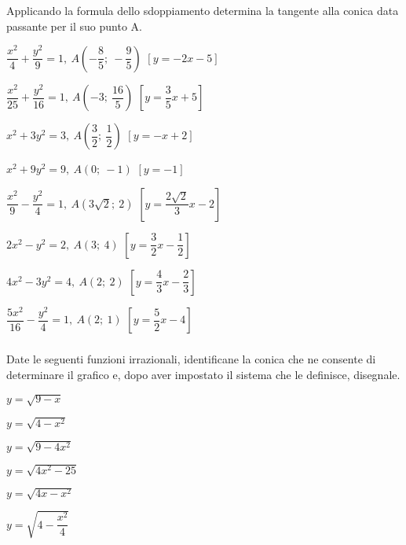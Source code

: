 \begin{esercizio}
  \label{ese:div.003}
  Applicando la formula dello sdoppiamento determina la tangente alla 
conica data passante per il suo punto A.
  \begin{enumeratea}
\item \(\dfrac{x^{2}}{4}+\dfrac{y^{2}}{9}=1,~A\left(-\dfrac{8}{5};~- 
\dfrac{9}{5}\right)\)  
\hfill \(\left[y=-2x-5\right]\)
\item \(\dfrac{x^{2}}{25}+\dfrac{y^{2}}{16}=1,~A\left(-3;~\dfrac{16}{5} 
\right)\)
\hfill \(\left[y=\dfrac{3}{5}x+5\right]\)
\item \(x^{2}+3y^{2}=3,~A\left(\dfrac{3}{2};~\dfrac{1}{2} \right)\)
\hfill \(\left[y=-x+2\right]\)
\item \(x^{2}+9y^{2}=9,~A(0;~-1)\)
\hfill \(\left[y=-1\right]\)
\item \(\dfrac{x^{2}}{9}-\dfrac{y^{2}}{4}=1,~A\left(3\sqrt{2};~2\right)\)
\hfill \(\left[y=\dfrac{2\sqrt{2}}{3}x-2\right]\)
\item \(2x^{2}-y^{2}=2,~A(3;~4)\)
\hfill \(\left[y=\dfrac{3}{2}x-\dfrac{1}{2}\right]\)
\item \(4x^{2}-3y^{2}=4,~A(2;~2)\)
\hfill \(\left[y=\dfrac{4}{3}x-\dfrac{2}{3}\right]\)
\item \(\dfrac{5x^{2}}{16}-\dfrac{y^{2}}{4}=1,~A(2;~1)\)
\hfill\(\left[y=\dfrac{5}{2}x-4\right]\)
\end{enumeratea}
\end{esercizio}


\subsubsection*{}

\begin{esercizio}
  \label{ese:div.003}
  Date le seguenti funzioni irrazionali, identificane la conica che 
ne consente di determinare il grafico e, dopo aver impostato il sistema che 
le definisce, disegnale. 
  \begin{enumeratea}
    \item \(y=\sqrt{9-x}\)
    \item \(y=\sqrt{4-x^{2}}\)
    \item \(y=\sqrt{9-4x^{2}}\)
    \item \(y=\sqrt{4x^{2}-25}\)
    \item \(y=\sqrt{4x-x^{2}}\)
    \item \(y=\sqrt{4-\dfrac{x^{2}}{4}}\)
  \end{enumeratea}
\end{esercizio}


